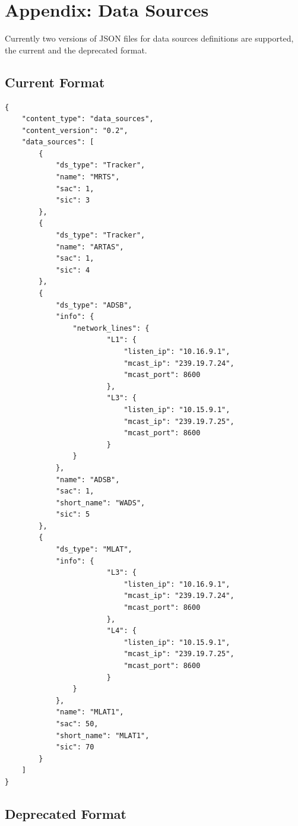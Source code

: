 \section{Appendix: Data Sources}
\label{sec:appendix_data_sources}

Currently two versions of JSON files for data sources definitions are supported, the current and the deprecated format.

\subsection{Current Format}

\begin{lstlisting}
{
    "content_type": "data_sources",
    "content_version": "0.2",
    "data_sources": [
        {
            "ds_type": "Tracker",
            "name": "MRTS",
            "sac": 1,
            "sic": 3
        },
        {
            "ds_type": "Tracker",
            "name": "ARTAS",
            "sac": 1,
            "sic": 4
        },
        {
            "ds_type": "ADSB",
            "info": {
                "network_lines": {
                        "L1": {
                            "listen_ip": "10.16.9.1",
                            "mcast_ip": "239.19.7.24",
                            "mcast_port": 8600
                        },
                        "L3": {
                            "listen_ip": "10.15.9.1",
                            "mcast_ip": "239.19.7.25",
                            "mcast_port": 8600
                        }
                }
            },
            "name": "ADSB",
            "sac": 1,
            "short_name": "WADS",
            "sic": 5
        },
        {
            "ds_type": "MLAT",
            "info": {
                        "L3": {
                            "listen_ip": "10.16.9.1",
                            "mcast_ip": "239.19.7.24",
                            "mcast_port": 8600
                        },
                        "L4": {
                            "listen_ip": "10.15.9.1",
                            "mcast_ip": "239.19.7.25",
                            "mcast_port": 8600
                        }
                }
            },
            "name": "MLAT1",
            "sac": 50,
            "short_name": "MLAT1",
            "sic": 70
        }
    ]
}
\end{lstlisting}

\subsection{Deprecated Format}

